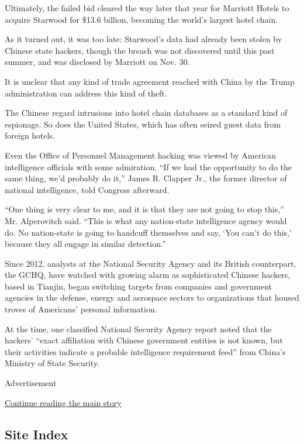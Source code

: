 Ultimately, the failed bid cleared the way later that year for Marriott
Hotels to acquire Starwood for \$13.6 billion, becoming the world's
largest hotel chain.

As it turned out, it was too late: Starwood's data had already been
stolen by Chinese state hackers, though the breach was not discovered
until this past summer, and was disclosed by Marriott on Nov. 30.

It is unclear that any kind of trade agreement reached with China by the
Trump administration can address this kind of theft.

The Chinese regard intrusions into hotel chain databases as a standard
kind of espionage. So does the United States, which has often seized
guest data from foreign hotels.

Even the Office of Personnel Management hacking was viewed by American
intelligence officials with some admiration. ``If we had the opportunity
to do the same thing, we'd probably do it,'' James R. Clapper Jr., the
former director of national intelligence, told Congress afterward.

``One thing is very clear to me, and it is that they are not going to
stop this,'' Mr. Alperovitch said. ``This is what any nation-state
intelligence agency would do. No nation-state is going to handcuff
themselves and say, `You can't do this,' because they all engage in
similar detection.''

Since 2012, analysts at the National Security Agency and its British
counterpart, the GCHQ, have watched with growing alarm as sophisticated
Chinese hackers, based in Tianjin, began switching targets from
companies and government agencies in the defense, energy and aerospace
sectors to organizations that housed troves of Americans' personal
information.

At the time, one classified National Security Agency report noted that
the hackers' ``exact affiliation with Chinese government entities is not
known, but their activities indicate a probable intelligence requirement
feed'' from China's Ministry of State Security.

Advertisement

\protect\hyperlink{after-bottom}{Continue reading the main story}

\hypertarget{site-index}{%
\subsection{Site Index}\label{site-index}}

